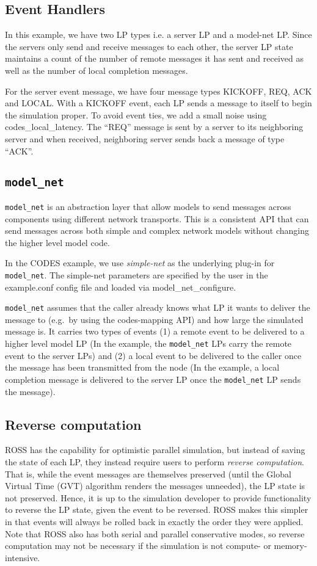 \documentclass[conference,10pt,compsocconf,onecolumn]{IEEEtran}
\newcommand{\codesmodelnet}[1]{\texttt{model\_net}}
\begin{document}
\subsection{Event Handlers}
In this example, we have two LP types i.e. a server LP and a model-net LP.
Since the servers only send and receive messages to each other, the server LP state
maintains a count of the number of remote messages it has sent and received as
well as the number of local completion messages.   

For the server event message, we have four message types KICKOFF, REQ, ACK and
LOCAL. With a KICKOFF event, each LP sends a message to itself to begin the
simulation proper. To avoid event ties, we add a small noise using
codes\_local\_latency. The ``REQ'' message is sent by a server to its
neighboring server and when received, neighboring server sends back a message
of type ``ACK''.

\subsection{\codesmodelnet{}}
\codesmodelnet{} is an abstraction layer that allow models to send messages
across components using different network transports. This is a consistent API
that can send messages across both simple and complex network models without
changing the higher level model code.

In the CODES example, we use \emph{simple-net} as the underlying plug-in for
\codesmodelnet{}. The simple-net parameters are specified by the user in the
example.conf config file and loaded via model\_net\_configure.

\codesmodelnet{} assumes that the caller already knows what LP it wants to
deliver the message to (e.g.\ by using the codes-mapping API) and how large the
simulated message is. It carries two types of events (1) a remote event to be
delivered to a higher level model LP (In the example, the \codesmodelnet{} LPs
carry the remote event to the server LPs) and (2) a local event to be delivered
to the caller once the message has been transmitted from the node (In the
example, a local completion message is delivered to the server LP once the
\codesmodelnet{} LP sends the message).

\subsection{Reverse computation}

ROSS has the capability for optimistic parallel simulation, but instead of
saving the state of each LP, they instead require users to perform \emph{reverse
computation}. That is, while the event messages are themselves preserved (until
the Global Virtual Time (GVT) algorithm renders the messages unneeded), the LP
state is not preserved. Hence, it is up to the simulation developer to provide
functionality to reverse the LP state, given the event to be reversed. ROSS
makes this simpler in that events will always be rolled back in exactly the
order they were applied. Note that ROSS also has both serial and parallel
conservative modes, so reverse computation may not be necessary if the
simulation is not compute- or memory-intensive.
\end{document}
